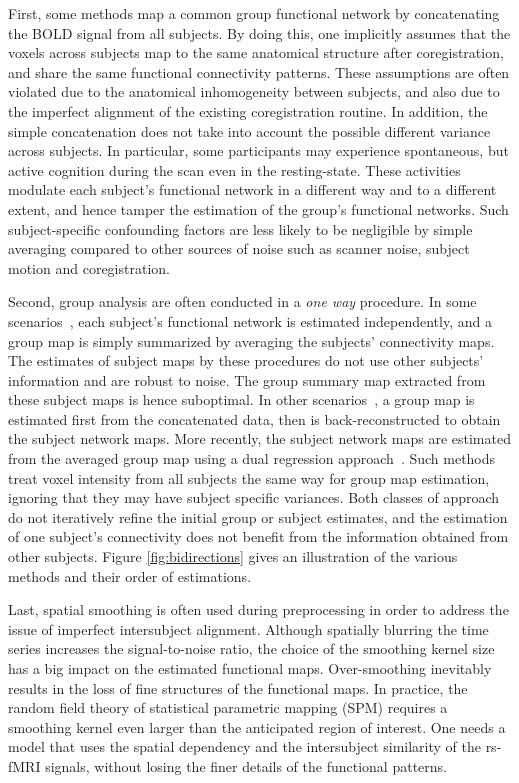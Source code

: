 First, some methods map a common group functional network by concatenating the
BOLD signal from all subjects. By doing this, one implicitly assumes that the
voxels across subjects map to the same anatomical structure after
coregistration, and share the same functional connectivity patterns. These
assumptions are often violated due to the anatomical inhomogeneity between
subjects, and also due to the imperfect alignment of the existing coregistration
routine. In addition, the simple concatenation does not take into account the
possible different variance across subjects. In particular, some participants
may experience spontaneous, but active cognition during the scan even in the
resting-state. These activities modulate each subject's functional network in a
different way and to a different extent, and hence tamper the estimation of the
group's functional networks. Such subject-specific confounding factors are less
likely to be negligible by simple averaging compared to other sources of noise
such as scanner noise, subject motion and coregistration.

Second, group analysis are often conducted in a \emph{one way} procedure. In
some scenarios~\cite{van2008normalized,craddock2012whole,greicius2004default,
  greicius2007resting,seeley2009neurodegenerative,mohammadi2009changes}, each
subject's functional network is estimated independently, and a group map is
simply summarized by averaging the subjects' connectivity maps. The estimates of
subject maps by these procedures do not use other subjects' information and are
robust to noise. The group summary map extracted from these subject maps is
hence suboptimal. In other scenarios~\cite{calhoun2001method}, a group map is
estimated first from the concatenated data, then is back-reconstructed to obtain
the subject network maps. More recently, the subject network maps are estimated
from the averaged group map using a dual regression
approach~\cite{filippini2009distinct,beckmann2009group}. Such methods treat
voxel intensity from all subjects the same way for group map estimation,
ignoring that they may have subject specific variances. Both classes of approach
do not iteratively refine the initial group or subject estimates, and the
estimation of one subject's connectivity does not benefit from the information
obtained from other subjects. Figure \ref{fig:bidirections} gives an
illustration of the various methods and their order of estimations.

Last, spatial smoothing is often used during preprocessing in order to address
the issue of imperfect intersubject alignment. Although spatially blurring the
time series increases the signal-to-noise ratio, the choice of the smoothing
kernel size has a big impact on the estimated functional maps. Over-smoothing
inevitably results in the loss of fine structures of the functional maps. In
practice, the random field theory of statistical parametric mapping (SPM)
\cite{friston2007statistical} requires a smoothing kernel even larger than the
anticipated region of interest. One needs a model that uses the spatial
dependency and the intersubject similarity of the rs-fMRI signals, without
losing the finer details of the functional patterns.

